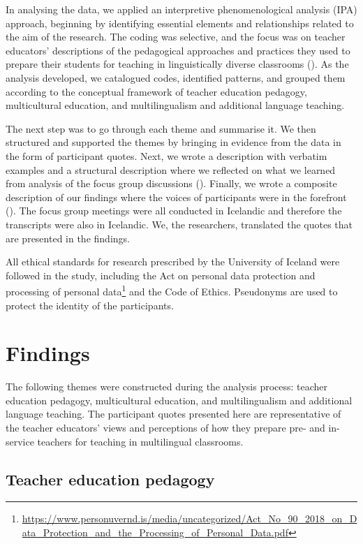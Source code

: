 \documentclass[output=paper]{langscibook}
\begin{document}
In analysing the data, we applied an interpretive phenomenological analysis (IPA) approach, beginning by identifying essential elements and relationships related to the aim of the research. The coding was selective, and the focus was on teacher educators’ descriptions of the pedagogical approaches and practices they used to prepare their students for teaching in linguistically diverse classrooms (\citealt{EatoughSmith2017}). As the analysis developed, we catalogued codes, identified patterns, and grouped them according to the conceptual framework of teacher education pedagogy, multicultural education, and multilingualism and additional language teaching.

The next step was to go through each theme and summarise it. We then structured and supported the themes by bringing in evidence from the data in the form of participant quotes. Next, we wrote a description with verbatim examples and a structural description where we reflected on what we learned from analysis of the focus group discussions (\citealt{BraunClarke2013,Wolcott2001}). Finally, we wrote a composite description of our findings where the voices of participants were in the forefront (\citealt{Creswell2008}). The focus group meetings were all conducted in Icelandic and therefore the transcripts were also in Icelandic. We, the researchers, translated the quotes that are presented in the findings.

All ethical standards for research prescribed by the University of Iceland were followed in the study, including the Act on personal data protection and processing of personal data\footnote{\url{https://www.personuvernd.is/media/uncategorized/Act_No_90_2018_on_Data_Protection_and_the_Processing_of_Personal_Data.pdf}} and the  Code of Ethics. Pseudonyms are used to protect the identity of the participants.

\section{Findings}

The following themes were constructed during the analysis process: teacher education pedagogy, multicultural education, and multilingualism and additional language teaching. The participant quotes presented here are representative of the teacher educators’ views and perceptions of how they prepare pre- and in-service teachers for teaching in multilingual classrooms.

\subsection{Teacher education pedagogy}
\end{document}
